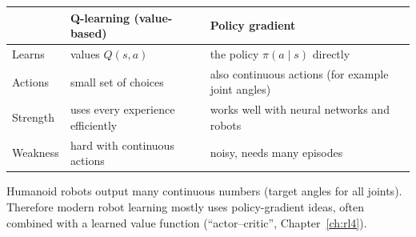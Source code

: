 \begin{center}
\renewcommand{\arraystretch}{1.3}
\begin{tabular}{p{3cm}p{5.4cm}p{5.4cm}}
 & \textbf{Q-learning (value-based)} & \textbf{Policy gradient}\\ \hline
Learns & values $Q(s,a)$ & the policy $\pi(a\mid s)$ directly\\
Actions & small set of choices & also continuous actions (for example joint angles)\\
Strength & uses every experience efficiently & works well with neural networks and robots\\
Weakness & hard with continuous actions & noisy, needs many episodes\\
\end{tabular}
\end{center}

\begin{keyidea}
Humanoid robots output many continuous numbers (target angles for all joints). Therefore modern robot learning mostly uses policy-gradient ideas, often combined with a learned value function (``actor--critic'', Chapter~\ref{ch:rl4}).
\end{keyidea}

